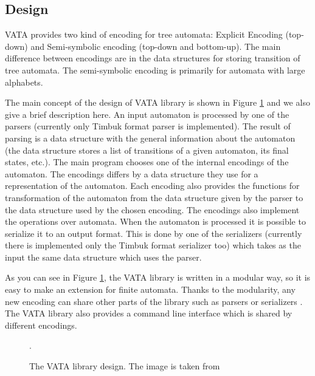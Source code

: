 \subsection{Design}
\label{sectionDesignVata}
VATA provides two kind of encoding for tree automata: Explicit Encoding (top-down) and Semi-symbolic encoding (top-down and bottom-up). The main difference
between encodings are
in the data structures for storing transition of tree automata. The semi-symbolic encoding is primarily for automata with large alphabets. 

The main concept of the design of VATA library is shown in Figure \ref{picVataDesign} and we also give a brief description here. 
An input automaton is processed by one of the parsers (currently
only Timbuk format parser is implemented). The result of parsing is a data structure with the general information about the automaton 
(the data structure stores a list
of transitions of a given automaton, its final states, etc.). The main program chooses one of the internal encodings of the automaton. The encodings
differs by a data structure they use for a representation of the automaton. Each encoding also provides the functions for transformation of the automaton 
from the data structure given by the parser to the data structure used by the chosen encoding. The encodings also implement
the operations over automata. When the automaton is processed it is possible to serialize it to an output format. 
This is done by one of the serializers (currently there is implemented only the Timbuk format serializer too) 
which takes as the input the same data structure which uses the parser.

As you can see in Figure \ref{picVataDesign}, the VATA library is written in a modular way, so it is easy to make an extension for finite automata. 
Thanks to the modularity, any new encoding can share other parts of the library such as parsers or serializers \cite{libvata}. 
The VATA library also provides a command line interface which is shared by different encodings.

\begin{figure}
\begin{center}

		\caption{The VATA library design. The image is taken from \cite{libvata}}.
		\label{picVataDesign}
\end{center}
\end{figure}

